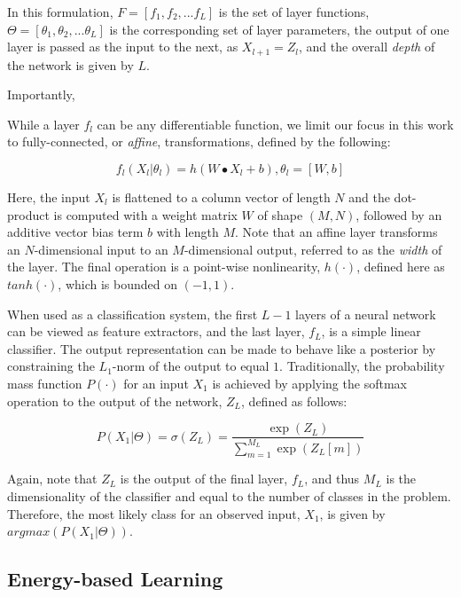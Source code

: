 \noindent In this formulation, $F = [f_1, f_2, ... f_{L} ]$ is the set of layer functions, $\Theta = [\theta_1, \theta_2, ... \theta_{L} ]$ is the corresponding set of layer parameters, the output of one layer is passed as the input to the next, as $X_{l+1} = Z_{l}$, and the overall \emph{depth} of the network is given by $L$.

Importantly,

While a layer $f_l$ can be any differentiable function, we limit our focus in this work to fully-connected, or \emph{affine}, transformations, defined by the following:

\begin{equation}
\label{eq:fclayer}
f_l(X_l \vert \theta_l) = h( W \bullet X_{l} + b), \theta_l = [W, b]
\end{equation}

\noindent Here, the input $X_l$ is flattened to a column vector of length $N$ and the dot-product is computed with a weight matrix $W$ of shape $(M, N)$, followed by an additive vector bias term $b$ with length $M$.
Note that an affine layer transforms an $N$-dimensional input to an $M$-dimensional output, referred to as the \emph{width} of the layer.
The final operation is a point-wise nonlinearity, $h(\cdot)$, defined here as $tanh(\cdot)$, which is bounded on $(-1, 1)$.

When used as a classification system, the first $L-1$ layers of a neural network can be viewed as feature extractors, and the last layer, $f_L$, is a simple linear classifier.
The output representation can be made to behave like a posterior by constraining the $L_1$-norm of the output to equal $1$.
Traditionally, the probability mass function $P(\cdot)$ for an input $X_1$ is achieved by applying the softmax operation to the output of the network, $Z_L$, defined as follows:

\begin{equation}
\label{eq:softmax}
P(X_1 | \Theta) = \sigma(Z_L) = \frac{\exp(Z_{L})}{ \sum_{m=1}^{M_{L}}\exp{(Z_{L}[m])}}
\end{equation}

\noindent Again, note that $Z_{L}$ is the output of the final layer, $f_L$, and thus $M_L$ is the dimensionality of the classifier and equal to the number of classes in the problem.
Therefore, the most likely class for an observed input, $X_1$, is given by $argmax(P(X_{1} | \Theta))$.

\subsection{Energy-based Learning}

